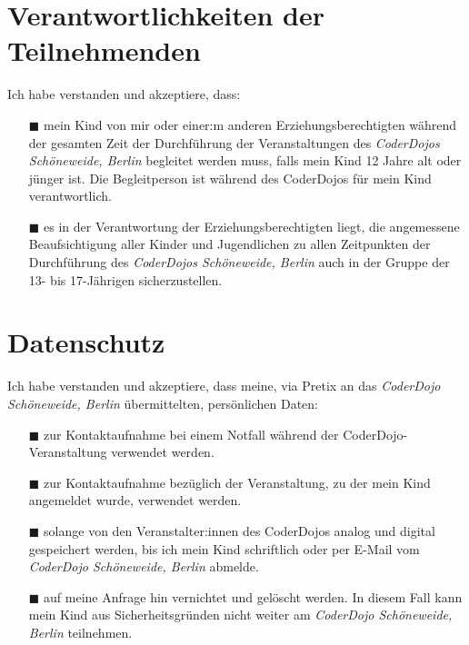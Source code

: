 \documentclass{coderdojoschoeneweide}
\begin{document}
\begin{Form}
		\section*{Verantwortlichkeiten der Teilnehmenden}

		Ich habe verstanden und akzeptiere, dass:

		\begin{itemize}
			\item[$\blacksquare$] mein Kind von mir oder einer:m anderen Erziehungsberechtigten während der gesamten Zeit der Durchführung der Veranstaltungen des \textit{CoderDojos Schöneweide, Berlin} begleitet werden muss, falls mein Kind 12 Jahre alt oder jünger ist. Die Begleitperson ist während des CoderDojos für mein Kind verantwortlich.

			\item[$\blacksquare$] es in der Verantwortung der Erziehungsberechtigten liegt, die angemessene Beaufsichtigung aller Kinder und Jugendlichen zu allen Zeitpunkten der Durchführung des \textit{CoderDojos Schöneweide, Berlin} auch in der Gruppe der 13- bis 17-Jährigen sicherzustellen.
		\end{itemize}

		\section*{Datenschutz}

		Ich habe verstanden und akzeptiere, dass meine, via Pretix an das \textit{CoderDojo Schöneweide, Berlin} übermittelten, persönlichen Daten:

		\begin{itemize}
			\item[$\blacksquare$] zur Kontaktaufnahme bei einem Notfall während der CoderDojo-Veranstaltung verwendet werden.

			\item[$\blacksquare$] zur Kontaktaufnahme bezüglich der Veranstaltung, zu der mein Kind angemeldet wurde, verwendet werden.

			\item[$\blacksquare$] solange von den Veranstalter:innen des CoderDojos analog und digital gespeichert werden, bis ich mein Kind schriftlich oder per E-Mail vom \textit{CoderDojo Schöneweide, Berlin} abmelde.

			\item[$\blacksquare$] auf meine Anfrage hin vernichtet und gelöscht werden. In diesem Fall kann mein Kind aus Sicherheitsgründen nicht weiter am \textit{CoderDojo Schöneweide, Berlin} teilnehmen.
		\end{itemize}

	\end{Form}
\end{document}
